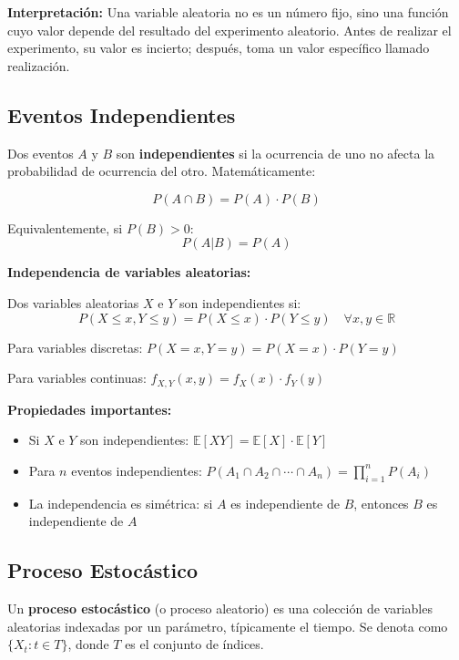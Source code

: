 \documentclass[12pt,a4paper]{article}
\begin{document}
\textbf{Interpretación:}
Una variable aleatoria no es un número fijo, sino una función cuyo valor depende del resultado del experimento aleatorio. Antes de realizar el experimento, su valor es incierto; después, toma un valor específico llamado realización.

\subsection{Eventos Independientes}

Dos eventos $A$ y $B$ son \textbf{independientes} si la ocurrencia de uno no afecta la probabilidad de ocurrencia del otro. Matemáticamente:

\begin{equation}
    P(A \cap B) = P(A) \cdot P(B)
\end{equation}

Equivalentemente, si $P(B) > 0$:
\begin{equation}
    P(A|B) = P(A)
\end{equation}

\textbf{Independencia de variables aleatorias:}

Dos variables aleatorias $X$ e $Y$ son independientes si:
\begin{equation}
    P(X \leq x, Y \leq y) = P(X \leq x) \cdot P(Y \leq y) \quad \forall x,y \in \mathbb{R}
\end{equation}

Para variables discretas: $P(X = x, Y = y) = P(X = x) \cdot P(Y = y)$

Para variables continuas: $f_{X,Y}(x,y) = f_X(x) \cdot f_Y(y)$

\textbf{Propiedades importantes:}
\begin{itemize}
    \item Si $X$ e $Y$ son independientes: $\mathbb{E}[XY] = \mathbb{E}[X] \cdot \mathbb{E}[Y]$
    \item Para $n$ eventos independientes: $P(A_1 \cap A_2 \cap \cdots \cap A_n) = \prod_{i=1}^n P(A_i)$
    \item La independencia es simétrica: si $A$ es independiente de $B$, entonces $B$ es independiente de $A$
\end{itemize}

\subsection{Proceso Estocástico}

Un \textbf{proceso estocástico} (o proceso aleatorio) es una colección de variables aleatorias indexadas por un parámetro, típicamente el tiempo. Se denota como $\{X_t : t \in T\}$, donde $T$ es el conjunto de índices.
\end{document}
